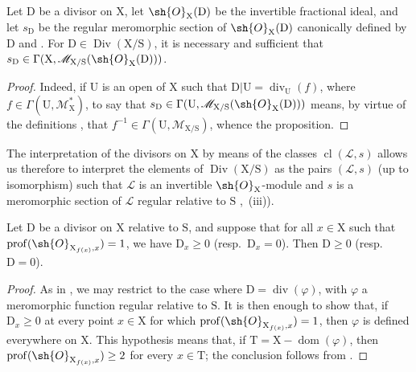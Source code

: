 \begin{proposition}[21.15.5]
\label{IV.21.15.5}
Let $\mathrm{D}$ be a divisor on $\mathrm{X}$, let $\sh{O}_{\mathrm{X}}(\mathrm{D})$ be the invertible fractional ideal, and let $s_{\mathrm{D}}$ be the regular meromorphic section of $\sh{O}_{\mathrm{X}}(\mathrm{D})$ canonically defined by $\mathrm{D}$  and .
For $\mathrm{D}\in\operatorname{Div}(\mathrm{X}/\mathrm{S})$, it is necessary and sufficient that $s_{\mathrm{D}}\in\Gamma(\mathrm{X},\mathscr{M}_{\mathrm{X}/\mathrm{S}}(\sh{O}_{\mathrm{X}}(\mathrm{D})))$.
\end{proposition}

\begin{proof}
Indeed, if $\mathrm{U}$ is an open of $\mathrm{X}$ such that $\mathrm{D}|\mathrm{U}=\operatorname{div}_{\mathrm{U}}(f)$, where $f\in\Gamma(\mathrm{U},\mathscr{M}_{\mathrm{X}}^*)$, to say that $s_{\mathrm{D}}\in\Gamma(\mathrm{U},\mathscr{M}_{\mathrm{X}/\mathrm{S}}(\sh{O}_{\mathrm{X}}(\mathrm{D})))$ means, by virtue of the definitions , that $f^{-1}\in\Gamma(\mathrm{U},\mathscr{M}_{\mathrm{X}/\mathrm{S}})$, whence the proposition.
\end{proof}

The interpretation of the divisors on $\mathrm{X}$ by means of the classes $\operatorname{cl}(\mathscr{L},s)$  allows us therefore to interpret the elements of $\operatorname{Div}(\mathrm{X}/\mathrm{S})$ as the pairs $(\mathscr{L},s)$ (up to isomorphism) such that $\mathscr{L}$ is an invertible $\sh{O}_{\mathrm{X}}$-module and $s$ is a meromorphic section of $\mathscr{L}$ regular relative to $\mathrm{S}$ ,~(iii)).

\begin{proposition}[21.15.6]
\label{IV.21.15.6}
Let $\mathrm{D}$ be a divisor on $\mathrm{X}$ relative to $\mathrm{S}$, and suppose that for all $x\in\mathrm{X}$ such that $\operatorname{prof}(\sh{O}_{\mathrm{X}_{f(x)},x})=1$, we have $\mathrm{D}_x\geq 0$ (resp.\ $\mathrm{D}_x=0$).
Then $\mathrm{D}\geq 0$ (resp.\ $\mathrm{D}=0$).
\end{proposition}

\begin{proof}
As in , we may restrict to the case where $\mathrm{D}=\operatorname{div}(\varphi)$, with $\varphi$ a meromorphic function regular relative to $\mathrm{S}$. It is then enough to show that, if $\mathrm{D}_x\geq0$ at every point $x\in\mathrm{X}$ for which $\operatorname{prof}(\sh{O}_{\mathrm{X}_{f(x)},x})=1$, then $\varphi$ is defined everywhere on $\mathrm{X}$.
This hypothesis means that, if $\mathrm{T}=\mathrm{X}-\operatorname{dom}(\varphi)$, then $\operatorname{prof}(\sh{O}_{\mathrm{X}_{f(x)},x})\geq2$ for every $x\in\mathrm{T}$; the conclusion follows from .
\end{proof}

